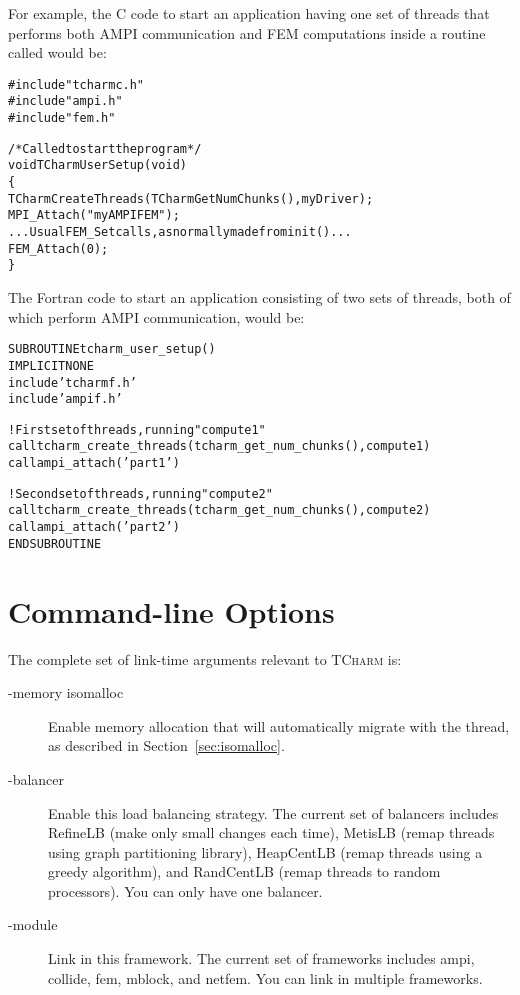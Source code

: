 \documentclass[10pt]{article}
\newcommand{\tcharm}{\textsc{TCharm}}
\begin{document}
For example, the C code to start an application having one set of threads
that performs both AMPI communication and FEM computations inside a 
routine called  would be:

\begin{alltt}
     #include "tcharmc.h"
     #include "ampi.h"
     #include "fem.h"
     
     /* Called to start the program */
     void TCharmUserSetup(void)
     \{
         TCharmCreateThreads(TCharmGetNumChunks(),myDriver);
         MPI\_Attach("myAMPIFEM");        
         ... Usual FEM_Set calls, as normally made from init() ...
         FEM\_Attach(0);
     \}
\end{alltt}

The Fortran code to start an application consisting of two sets of threads,
both of which perform AMPI communication, would be:

\begin{alltt}
     SUBROUTINE tcharm\_user\_setup()
       IMPLICIT NONE
       include 'tcharmf.h'
       include 'ampif.h'
       
    ! First set of threads, running "compute1"
       call tcharm\_create\_threads(tcharm\_get\_num\_chunks(),compute1)
       call ampi\_attach('part1')
       
    ! Second set of threads, running "compute2"
       call tcharm\_create\_threads(tcharm\_get\_num\_chunks(),compute2)
       call ampi\_attach('part2')
     END SUBROUTINE
\end{alltt}



\section{Command-line Options}
\label{sec:cla}

The complete set of link-time arguments relevant to \tcharm{} is:
\begin{description}
\item[-memory isomalloc] Enable memory allocation that will automatically
migrate with the thread, as described in Section~\ref{sec:isomalloc}.

\item[-balancer ] Enable this load balancing strategy.  The
current set of balancers  includes RefineLB (make only small changes
each time), MetisLB (remap threads using graph partitioning library), 
HeapCentLB (remap threads using a greedy algorithm), and RandCentLB
(remap threads to random processors).  You can only have one balancer.

\item[-module ] Link in this framework.  The current set of frameworks
 includes ampi, collide, fem, mblock, and netfem.  You can link in 
multiple frameworks.

\end{description}
\end{document}
